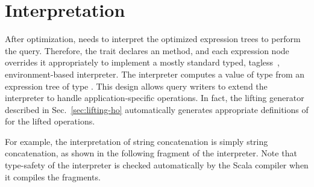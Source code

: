 %
%
%
%
%
%
\section{Interpretation}
\label{sec:interpretation}

After optimization, {\LoS} needs to interpret the optimized expression trees to perform the query. Therefore, the trait  declares an  method, and each expression node overrides it appropriately to implement a mostly standard typed, tagless~\citep{carette09finally}, environment-based interpreter. The interpreter computes a value of type  from an expression tree of type . This design allows query writers to extend the interpreter to handle application-specific operations. In fact, the lifting generator described in Sec.~\ref{sec:lifting-ho} automatically generates appropriate definitions of  for the lifted operations. 

For example, the interpretation of string concatenation is simply string concatenation, as shown in the following fragment of the interpreter. Note that type-safety of the interpreter is checked automatically by the Scala compiler when it compiles the fragments.

